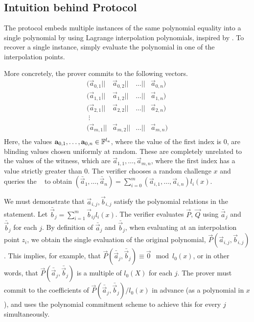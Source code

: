 \subsection{Intuition behind Protocol}
The protocol embeds multiple instances of the same polynomial equality into a single polynomial by using Lagrange interpolation polynomials, inspired by \cite{Gennaro2013,Bayer2014}. To recover a single instance, simply evaluate the polynomial in one of the interpolation points.

More concretely, the prover commits to the following vectors.
$$\begin{array}{llllll}
(\vec{a}_{0,1}||&\vec{a}_{0,2}||&\ldots||&\vec{a}_{0,n}) \\
(\vec{a}_{1,1}||&\vec{a}_{1,2}||&\ldots||&\vec{a}_{1,n}) \\
(\vec{a}_{2,1}||&\vec{a}_{2,2}||&\ldots||&\vec{a}_{2,n}) \\
\;\vdots \\
(\vec{a}_{m,1}||&\vec{a}_{m,2}||&\ldots||&\vec{a}_{m,n}) \\
\end{array}$$
Here, the values $\mathbf{a}_{0,1},\ldots,\mathbf{a}_{0,n} \in \mathbb{F}^{l_a}$, where the value of the first index is $0$, are blinding values chosen uniformly at random. These are completely unrelated to the values of the witness, which are $\vec{a}_{1,1},\ldots,\vec{a}_{m,n}$, where the first index has a value strictly greater than $0$. The verifier chooses a random challenge $x$ and queries the \ILC~ to obtain $(\bar{\vec{a}}_1,\ldots,\bar{\vec{a}}_n) = \sum_{i=0}^m (\vec{a}_{i,1},\ldots,\vec{a}_{i,n}) l_i(x)$.

We must demonstrate that $\vec{a}_{i,j}, \vec{b}_{i,j}$ satisfy the polynomial relations in the statement. Let $\bar{\vec{b}}_j = \sum_{i=1}^m \vec{b}_{ij} l_i(x)$. The verifier evaluates $\vec{P}$, $\vec{Q}$ using $\bar{\vec{a}}_j$ and $\bar{\vec{b}}_j$ for each $j$. By definition of $\bar{\vec{a}}_j$ and $\bar{\vec{b}}_j$, when evaluating at an interpolation point $z_i$, we obtain the single evaluation of the original polynomial, $\vec{P}(\vec{a}_{i,j},\vec{b}_{i,j})$. This implies, for example, that $\vec{P}(\bar{\vec{a}}_j,\bar{\vec{b}}_j) \equiv \vec{0} \mod l_0(x)$, or in other words, that $\vec{P}(\bar{\vec{a}}_j,\bar{\vec{b}}_j)$ is a multiple of $l_0(X)$ for each $j$. The prover must commit to the coefficients of $\vec{P}(\bar{\vec{a}}_j,\bar{\vec{b}}_j) / l_0(x)$ in advance (as a polynomial in $x$), and uses the polynomial commitment scheme to achieve this for every $j$ simultaneously.

